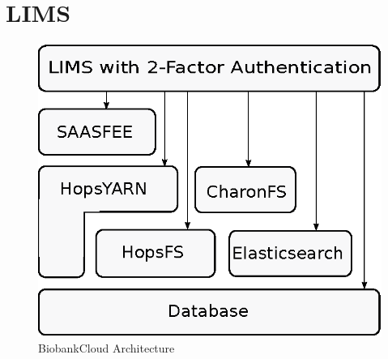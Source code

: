 \section{LIMS}

 \begin{figure}[h]
 \centering
 \includegraphics[scale=0.8]{./imgs/stack.eps}
 \caption{BiobankCloud Architecture}
 \label{fig:lim}
\end{figure}



